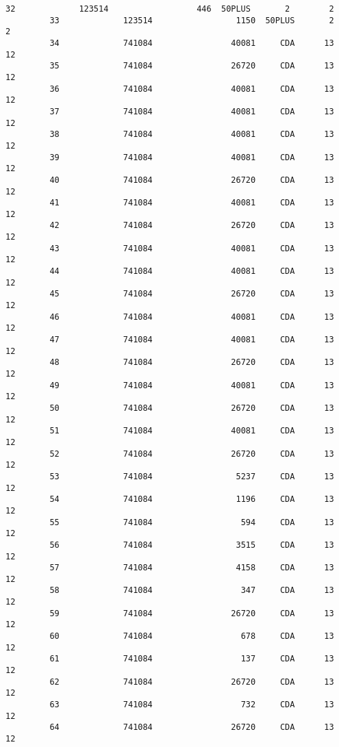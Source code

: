\documentclass{article}
\begin{document}
\begin{Verbatim}[commandchars=\\\{\}]
         32             123514                  446  50PLUS       2        2   
         33             123514                 1150  50PLUS       2        2   
         34             741084                40081     CDA      13       12   
         35             741084                26720     CDA      13       12   
         36             741084                40081     CDA      13       12   
         37             741084                40081     CDA      13       12   
         38             741084                40081     CDA      13       12   
         39             741084                40081     CDA      13       12   
         40             741084                26720     CDA      13       12   
         41             741084                40081     CDA      13       12   
         42             741084                26720     CDA      13       12   
         43             741084                40081     CDA      13       12   
         44             741084                40081     CDA      13       12   
         45             741084                26720     CDA      13       12   
         46             741084                40081     CDA      13       12   
         47             741084                40081     CDA      13       12   
         48             741084                26720     CDA      13       12   
         49             741084                40081     CDA      13       12   
         50             741084                26720     CDA      13       12   
         51             741084                40081     CDA      13       12   
         52             741084                26720     CDA      13       12   
         53             741084                 5237     CDA      13       12   
         54             741084                 1196     CDA      13       12   
         55             741084                  594     CDA      13       12   
         56             741084                 3515     CDA      13       12   
         57             741084                 4158     CDA      13       12   
         58             741084                  347     CDA      13       12   
         59             741084                26720     CDA      13       12   
         60             741084                  678     CDA      13       12   
         61             741084                  137     CDA      13       12   
         62             741084                26720     CDA      13       12   
         63             741084                  732     CDA      13       12   
         64             741084                26720     CDA      13       12   

\end{Verbatim}
\end{document}
